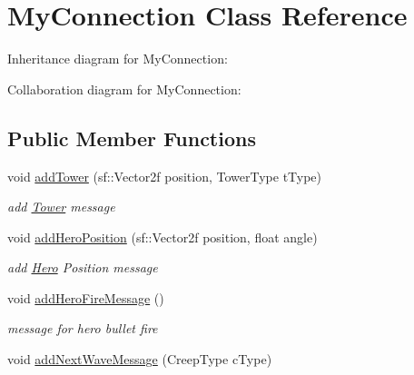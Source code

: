 \hypertarget{class_my_connection}{\section{My\+Connection Class Reference}
\label{class_my_connection}
}


Inheritance diagram for My\+Connection\+:


Collaboration diagram for My\+Connection\+:
\subsection*{Public Member Functions}
\begin{DoxyCompactItemize}
\item 
\hypertarget{class_my_connection_a5a3744d66ac71024dc4c1017a584d64d}{void \hyperlink{class_my_connection_a5a3744d66ac71024dc4c1017a584d64d}{add\+Tower} (sf\+::\+Vector2f position, Tower\+Type t\+Type)}\label{class_my_connection_a5a3744d66ac71024dc4c1017a584d64d}

\begin{DoxyCompactList}\small\item\em add \hyperlink{class_tower}{Tower} message \end{DoxyCompactList}\item 
\hypertarget{class_my_connection_a10bdc80fe835f62403d0c97fb7389606}{void \hyperlink{class_my_connection_a10bdc80fe835f62403d0c97fb7389606}{add\+Hero\+Position} (sf\+::\+Vector2f position, float angle)}\label{class_my_connection_a10bdc80fe835f62403d0c97fb7389606}

\begin{DoxyCompactList}\small\item\em add \hyperlink{class_hero}{Hero} Position message \end{DoxyCompactList}\item 
\hypertarget{class_my_connection_a4cb280cab383e4eab0c81269cf2c0d63}{void \hyperlink{class_my_connection_a4cb280cab383e4eab0c81269cf2c0d63}{add\+Hero\+Fire\+Message} ()}\label{class_my_connection_a4cb280cab383e4eab0c81269cf2c0d63}

\begin{DoxyCompactList}\small\item\em message for hero bullet fire \end{DoxyCompactList}\item 
\hypertarget{class_my_connection_af74a010560c47d22262f0d055b9c2cf9}{void \hyperlink{class_my_connection_af74a010560c47d22262f0d055b9c2cf9}{add\+Next\+Wave\+Message} (Creep\+Type c\+Type)}\label{class_my_connection_af74a010560c47d22262f0d055b9c2cf9}


\end{DoxyCompactItemize}
